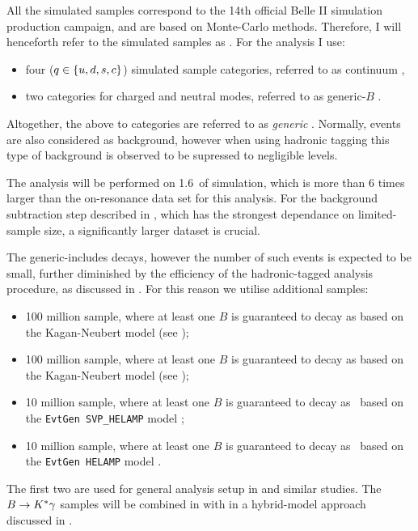 All the simulated samples correspond to the 14th official Belle II simulation production campaign, and are based on Monte-Carlo methods.
Therefore, I will henceforth refer to the simulated samples as \MC.
For the analysis I use:
\begin{itemize}
    \item four \epem\ra\qqbar ($q\in\{u,d,s,c\}$) simulated sample categories, referred to as continuum \MC,
    \item two \FourS\ra\BB categories for charged and neutral \B modes, referred to as generic-$B$ \MC.
\end{itemize}
Altogether, the above to categories are referred to as \textit{generic} \MC.
Normally, \epem\ra\tautau events are also considered as background, however when using hadronic tagging this type of background is observed to be supressed to negligible levels.

The analysis will be performed on 1.6~\invab of simulation, which is more than 6 times larger than the on-resonance data set for this analysis.
For the background subtraction step described in , which has the strongest dependance on limited-\MC sample size, a significantly larger dataset is crucial.

The generic-\B \MC includes \BtoXsgamma decays, however the number of such events is expected to be small, further diminished by the efficiency of the hadronic-tagged analysis procedure, as discussed in .
For this reason we utilise additional samples:
\begin{itemize}
    \item 100 million \BpBm sample, where at least one $B$ is guaranteed to decay as \BptoXsgamma based on the Kagan-Neubert model \cite{Kagan:1998ym} (see );
    \item 100 million \BzBzb sample, where at least one $B$ is guaranteed to decay as \BztoXsgamma based on the Kagan-Neubert model \cite{Kagan:1998ym} (see );
    \item 10 million \BpBm sample, where at least one $B$ is guaranteed to decay as \Bpm\ra\Kstarpm\gamma~based on the \texttt{EvtGen SVP\_HELAMP} model \cite{Ryd:2005zz};
    \item 10 million \BzBzb sample, where at least one $B$ is guaranteed to decay as \Bz\ra\Kstarz\gamma~based on the \texttt{EvtGen HELAMP} model \cite{Ryd:2005zz}.
\end{itemize}
The first two are used for general analysis setup in 
 and similar studies.
The $B\rightarrow K^*\gamma$ samples will be combined in with \BtoXsgamma in a hybrid-model approach \cite{Ramirez:1989yk} discussed in .

